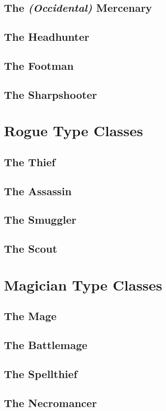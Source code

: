 \documentclass[openany,11pt,a4paper]{book}
\begin{document}
\subsection{The \textit{(Occidental)} Mercenary}
\subsection{The Headhunter}
\subsection{The Footman}
\subsection{The Sharpshooter}
\section{Rogue Type Classes}
\subsection{The Thief}
\subsection{The Assassin}
\subsection{The Smuggler}
\subsection{The Scout}
\section{Magician Type Classes}
\subsection{The Mage}
\subsection{The Battlemage}
\subsection{The Spellthief}
\subsection{The Necromancer}
\end{document}
